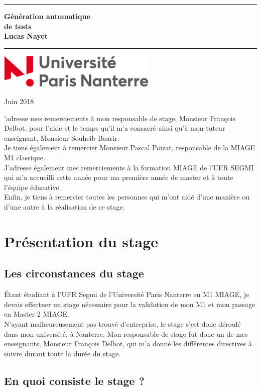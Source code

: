 \documentclass[12pt,twoside]{book}
\newcommand{\LMUTitle}[9]{
  \thispagestyle{empty}
  \vspace*{\stretch{1}}
  {\parindent0cm
   \rule{\linewidth}{.7ex}}
  \begin{flushright}

    \vspace*{\stretch{1}}
    \sffamily\bfseries\Huge
    #1\\
    \vspace*{\stretch{1}}
    \sffamily\bfseries\large
    #2
    \vspace*{\stretch{1}}
  \end{flushright}
  \rule{\linewidth}{.7ex}
  \vspace*{\stretch{5}}
  \begin{center}
    \includegraphics[width=3in]{UPN-logo.jpg}
  \end{center}
  \vspace*{\stretch{1}}
  \begin{center}\sffamily\LARGE{#3}\end{center}
  \newpage
  \thispagestyle{empty}
}
\begin{document}
  \LMUTitle
      {Génération automatique\\
      de tests}              
      {Lucas Nayet}                       
      {Juin 2018}                          

\thispagestyle{empty}
\setcounter{page}{0}
J'adresse mes remerciements à mon responsable de stage, Monsieur François Delbot, pour l'aide et le temps qu'il m'a consacré ainsi qu'à mon tuteur enseignant, Monsieur Souheib Baarir.\\
Je tiens également à remercier Monsieur Pascal Poizat, responsable de la MIAGE M1 classique.\\
J'adresse également mes remerciements à la formation MIAGE de l'UFR SEGMI qui m'a accueilli cette année pour ma première année de master et à toute l'équipe éducative.\\
Enfin, je tiens à remercier toutes les personnes qui m'ont aidé d'une manière ou d'une autre à la réalisation de ce stage.

\tableofcontents

\color{red}
\chapter{Présentation du stage}
\color{black}
\section {Les circonstances du stage}
Étant étudiant à l'UFR Segmi de l'Université Paris Nanterre en M1 MIAGE, je devais effectuer un stage nécessaire pour la validation de mon M1 et mon passage en Master 2 MIAGE.\\ 
N'ayant malheureusement pas trouvé d'entreprise, le stage s'est donc déroulé dans mon université, à Nanterre. Mon responsable de stage fut donc un de mes enseignants, Monsieur François Delbot, qui m'a donné les différentes directives à suivre durant toute la durée du stage.

\section {En quoi consiste le stage ?}
\end{document}
